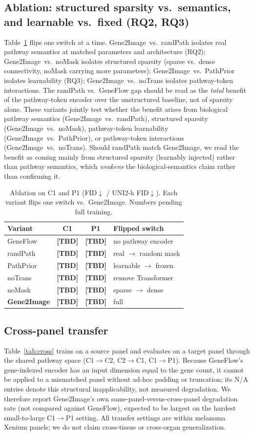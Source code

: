 \documentclass[journal]{IEEEtran}
\newcommand{\TBD}{{\color{red}\textbf{[TBD]}}}
\newcommand{\method}{Gene2Image}
\begin{document}
\subsection{Ablation: structured sparsity vs.\ semantics, and learnable vs.\ fixed (RQ2, RQ3)}
Table~\ref{tab:ablation} flips one switch at a time. \method\ vs.\ randPath
isolates real pathway semantics at matched parameters and architecture (RQ2);
\method\ vs.\ noMask isolates structured sparsity (sparse vs.\ dense connectivity,
noMask carrying more parameters); \method\ vs.\ PathPrior isolates learnability
(RQ3); \method\ vs.\ noTrans isolates pathway-token interactions. The randPath vs.\
GeneFlow gap should be read as the \emph{total} benefit of the pathway-token
encoder over the unstructured baseline, not of sparsity alone. These variants jointly test whether the benefit arises from biological pathway
semantics (\method\ vs.\ randPath), structured sparsity (\method\ vs.\ noMask),
pathway-token learnability (\method\ vs.\ PathPrior), or pathway-token interactions
(\method\ vs.\ noTrans). Should randPath match \method, we read the benefit as
coming mainly from structured sparsity (learnably injected) rather than pathway
semantics, which \emph{weakens} the biological-semantics claim rather than
confirming it.

\begin{table}[t]
\centering
\caption{Ablation on C1 and P1 (FID$\downarrow$ / UNI2-h FID$\downarrow$). Each variant flips one switch vs.\ \method. Numbers pending full training.}
\label{tab:ablation}
\renewcommand{\arraystretch}{1.2}
\begin{tabular}{@{}lccl@{}}
\toprule
Variant & C1 & P1 & Flipped switch \\
\midrule
GeneFlow & \TBD & \TBD & no pathway encoder \\
randPath & \TBD & \TBD & real $\to$ random mask \\
PathPrior & \TBD & \TBD & learnable $\to$ frozen \\
noTrans & \TBD & \TBD & remove Transformer \\
noMask & \TBD & \TBD & sparse $\to$ dense \\
\textbf{\method} & \TBD & \TBD & full \\
\bottomrule
\end{tabular}
\end{table}

\subsection{Cross-panel transfer}
Table~\ref{tab:cross} trains on a source panel and evaluates on a target panel
through the shared pathway space (C1$\to$C2, C2$\to$C1, C1$\to$P1). Because
GeneFlow's gene-indexed encoder has an input dimension equal to the gene count, it
cannot be applied to a mismatched panel without ad-hoc padding or truncation; its
N/A entries denote this structural inapplicability, not measured degradation. We
therefore report \method's own same-panel-versus-cross-panel degradation rate
(not compared against GeneFlow), expected to be largest on the hardest
small-to-large C1$\to$P1 setting. All transfer settings are within melanoma Xenium
panels; we do not claim cross-tissue or cross-organ generalization.
\end{document}
